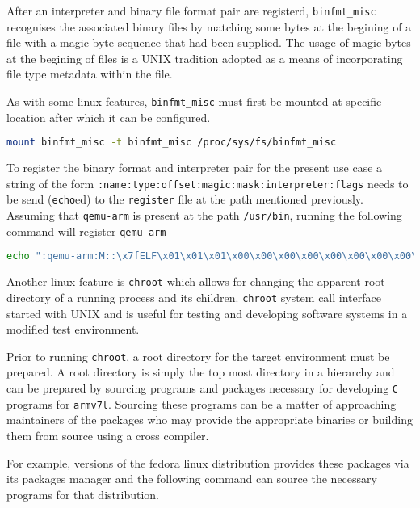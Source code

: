 After an interpreter and binary file format pair are registerd, \texttt{binfmt\_misc} recognises the associated binary files by matching some bytes at the begining of a file with a magic byte sequence that had been supplied. The usage of magic bytes at the begining of files is a UNIX tradition adopted as a means of incorporating file type metadata within the file.

As with some linux features, \texttt{binfmt\_misc} must first be mounted at specific location after which it can be configured.

\begin{lstlisting}[language=Bash]
	mount binfmt_misc -t binfmt_misc /proc/sys/fs/binfmt_misc
\end{lstlisting}

To register the binary format and interpreter pair for the present use case a string of the form \texttt{:name:type:offset:magic:mask:interpreter:flags} needs to be send (\texttt{echo}ed) to the \texttt{register} file at the path mentioned previously. Assuming that \texttt{qemu-arm} is present at the path \texttt{/usr/bin}, running the following command will register \texttt{qemu-arm}

\begin{lstlisting}[language=Bash]
	echo ":qemu-arm:M::\x7fELF\x01\x01\x01\x00\x00\x00\x00\x00\x00\x00\x00\x00\x02\x00\x28\x00:\xff\xff\xff\xff\xff\xff\xff\x00\xff\xff\xff\xff\xff\xff\xff\xff\xfe\xff\xff\xff:/usr/bin/qemu-arm-static:F" > /proc/sys/fs/binfmt_misc
\end{lstlisting}

Another linux feature is \texttt{chroot} which allows for changing the apparent root directory of a running process and its children. \texttt{chroot} system call interface started with UNIX and is useful for testing and developing software systems in a modified test environment.

Prior to running \texttt{chroot}, a root directory for the target environment must be prepared. A root directory is simply the top most directory in a hierarchy and can be prepared by sourcing programs and packages necessary for developing \texttt{C} programs for \texttt{armv7l}. Sourcing these programs can be a matter of approaching maintainers of the packages who may provide the appropriate binaries or building them from source using a cross compiler.

For example, versions of the fedora linux distribution provides these packages via its packages manager and the following command can source the necessary programs for that distribution.

